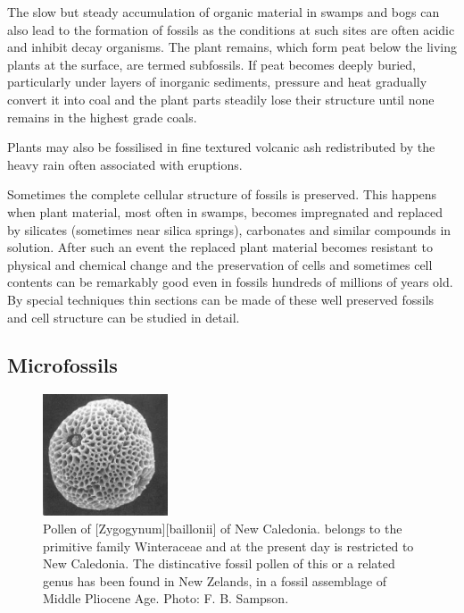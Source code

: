 The slow but steady accumulation of organic material in swamps and bogs can also lead to the formation of fossils as the conditions at such sites are often acidic and inhibit decay organisms.
The plant remains, which form peat below the living plants at the surface, are termed subfossils.
If peat becomes deeply buried, particularly under layers of inorganic sediments, pressure and heat gradually convert it into coal and the plant parts steadily lose their structure until none remains in the highest grade coals.

Plants may also be fossilised in fine textured volcanic ash redistributed by the heavy rain often associated with eruptions.

Sometimes the complete cellular structure of fossils is preserved.
This happens when plant material, most often in swamps, becomes impregnated and replaced by silicates (sometimes near silica springs), carbonates and similar compounds in solution.
After such an event the replaced plant material becomes resistant to physical and chemical change and the preservation of cells and sometimes cell contents can be remarkably good even in fossils hundreds of millions of years old.
By special techniques thin sections can be made of these well preserved fossils and cell structure can be studied in detail.

\subsection{Microfossils}

\begin{figure}
	\includegraphics[width=0.33\textwidth]{graphics/figure122pollen.jpg}
	\centering
	\caption[Pollen of \emph{Zygogynum baillonii} of New Caledonia]{Pollen of [Zygogynum][baillonii] of New Caledonia.  belongs to the primitive family Winteraceae and at the present day is restricted to New Caledonia.
	The distincative fossil pollen of this or a related genus has been found in New Zelands, in a fossil assemblage of Middle Pliocene Age.
	Photo: F. B. Sampson.}%
	\label{fig:122pollen}
\end{figure}

